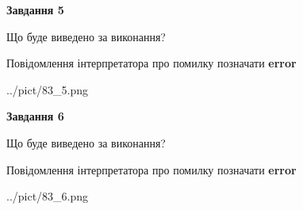 \documentclass[12pt, ukrainian]{article}
\begin{document}
{{\begin {center}\textbf{Завдання 5}\end {center}}\par
Що буде виведено за виконання? \par
Повідомлення інтерпретатора про помилку позначати \textbf{error}

\begin{center}
	{../pict/83_5.png}
\end{center}
\newpage

{\begin {center}\textbf{Завдання 6}\end {center}}\par
Що буде виведено за виконання? \par
Повідомлення інтерпретатора про помилку позначати \textbf{error}

\begin{center}
	{../pict/83_6.png}
\end{center}
\newpage

}
\end{document}
